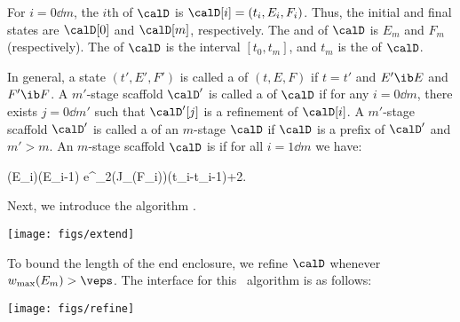	For $i=0\dd m$, the $i$th  of $\calD$
	is $\calD[i]=(t_i, E_i, F_i)$.
	Thus, the initial and final states are $\calD[0]$ and $\calD[m]$,
	respectively.
	The  and  of $\calD$ is $E_m$ and $F_m$
	(respectively).  The  of $\calD$ is the interval
	$[t_0,t_m]$, and $t_m$ is the  of $\calD$.

%

	In general, a state $(t',E',F')$ is called a  of
	$(t,E,F)$ if $t=t'$ and $E'\ib E$ and $F'\ib F$.
	A $m'$-stage scaffold $\calD'$
	is called a  of $\calD$ if 
	for any $i=0\dd m$, 
	there exists $j=0\dd m'$ such that
	$\calD'[j]$ is a refinement of $\calD[i]$.
	A $m'$-stage scaffold $\calD'$
	is called a  of an $m$-stage $\calD$ if $\calD$ is a
	prefix of $\calD'$ and $m'>m$.
	An $m$-stage scaffold $\calD$
	is  if for all $i=1\dd m$ we have:

		\wmax(E_i)\le \wmax(E_{i-1})
			\cdot e^{\mu_2(J_{\bff}(F_i))(t_i-t_{i-1})}+2\delta.
	\eeql

	Next, we introduce the algorithm \Extend.
	
			\texttt{[image: figs/extend]}
		\eeql



	To bound the length of the end enclosure, we refine \(\calD\)
	whenever \(\wmax(E_m) > \veps\). 
		The interface for this \Refine\ algorithm is as follows:
	
			\texttt{[image: figs/refine]}
		\eeql



